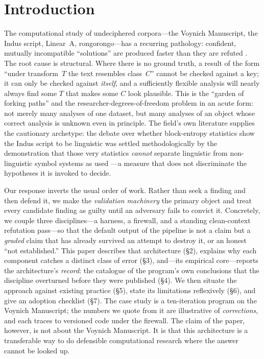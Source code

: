 \documentclass[11pt]{article}
\begin{document}
\section{Introduction}
The computational study of undeciphered corpora---the Voynich Manuscript, the Indus script,
Linear~A, rongorongo---has a recurring pathology: confident, mutually incompatible
``solutions'' are produced faster than they are refuted \citep{reddy2011know,
bowern2021linguistics}. The root cause is structural. Where there is no ground truth, a
result of the form ``under transform~$T$ the text resembles class~$C$'' cannot be checked
against a key; it can only be checked against \emph{itself}, and a sufficiently flexible
analysis will nearly always find some $T$ that makes some $C$ look plausible. This is the
``garden of forking paths'' \citep{gelman2013garden} and the researcher-degrees-of-freedom
problem \citep{simmons2011false} in an acute form: not merely many analyses of one dataset,
but many analyses of an object whose correct analysis is unknown even in principle. The
field's own literature supplies the cautionary archetype: the debate over whether
block-entropy statistics show the Indus script to be linguistic
\citep{rao2009entropic} was settled methodologically by the demonstration that those very
statistics \emph{cannot} separate linguistic from non-linguistic symbol systems as used
\citep{sproat2014statistical}---a measure that does not discriminate the hypotheses it is
invoked to decide.

Our response inverts the usual order of work. Rather than seek a finding and then defend
it, we make the \emph{validation machinery} the primary object and treat every candidate
finding as guilty until an adversary fails to convict it. Concretely, we couple three
disciplines---a harness, a firewall, and a standing clean-context refutation pass---so that
the default output of the pipeline is not a claim but a \emph{graded} claim that has
already survived an attempt to destroy it, or an honest ``not established.'' This paper
describes that architecture (\S2), explains why each component catches a distinct class of
error (\S3), and---its empirical core---reports the architecture's \emph{record}: the
catalogue of the program's own conclusions that the discipline overturned before they were
published (\S4). We then situate the approach against existing practice (\S5), state its
limitations reflexively (\S6), and give an adoption checklist (\S7). The case study is a
ten-iteration program on the Voynich Manuscript; the numbers we quote from it are
illustrative of \emph{corrections}, and each traces to versioned code under the firewall.
The claim of the paper, however, is not about the Voynich Manuscript. It is that this
architecture is a transferable way to do defensible computational research where the answer
cannot be looked up.
\end{document}
